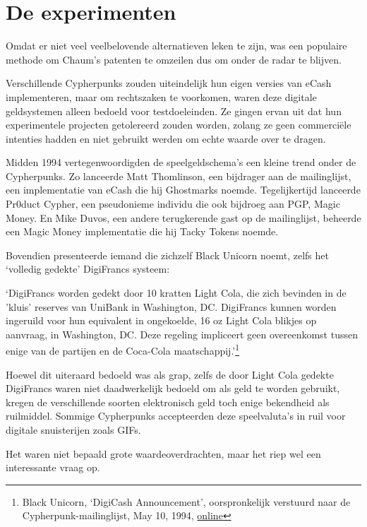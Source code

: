\documentclass[
  a5paper,
  smalldemyvopaper,11pt,twoside,onecolumn,openright,extrafontsizes]{memoir}
\begin{document}
\section{De experimenten}\label{de-experimenten}

Omdat er niet veel veelbelovende alternatieven leken te zijn, was een
populaire methode om Chaum's patenten te omzeilen dus om onder de radar
te blijven.

Verschillende Cypherpunks zouden uiteindelijk hun eigen versies van
eCash implementeren, maar om rechtszaken te voorkomen, waren deze
digitale geldsystemen alleen bedoeld voor testdoeleinden. Ze gingen
ervan uit dat hun experimentele projecten getolereerd zouden worden,
zolang ze geen commerciële intenties hadden en niet gebruikt werden om
echte waarde over te dragen.

Midden 1994 vertegenwoordigden de speelgeldschema's een kleine trend
onder de Cypherpunks. Zo lanceerde Matt Thomlinson, een bijdrager aan de
mailinglijst, een implementatie van eCash die hij Ghostmarks noemde.
Tegelijkertijd lanceerde Pr0duct Cypher, een pseudonieme individu die
ook bijdroeg aan PGP, Magic Money. En Mike Duvos, een andere
terugkerende gast op de mailinglijst, beheerde een Magic Money
implementatie die hij Tacky Tokens noemde.

Bovendien presenteerde iemand die zichzelf Black Unicorn noemt, zelfs
het `volledig gedekte' DigiFrancs systeem:

`DigiFrancs worden gedekt door 10 kratten Light Cola, die zich bevinden
in de 'kluis' reserves van UniBank in Washington, DC. DigiFrancs kunnen
worden ingeruild voor hun equivalent in ongekoelde, 16 oz Light Cola
blikjes op aanvraag, in Washington, DC. Deze regeling impliceert geen
overeenkomst tussen enige van de partijen en de Coca-Cola
maatschappij.'\footnote{Black Unicorn, `DigiCash Announcement',
  oorspronkelijk verstuurd naar de Cypherpunk-mailinglijst, May 10,
  1994,
  \href{https://cypherpunks.venona.com/date/1994/05/msg00616.html}{online}}

Hoewel dit uiteraard bedoeld was als grap, zelfs de door Light Cola
gedekte DigiFrancs waren niet daadwerkelijk bedoeld om als geld te
worden gebruikt, kregen de verschillende soorten elektronisch geld toch
enige bekendheid als ruilmiddel. Sommige Cypherpunks accepteerden deze
speelvaluta's in ruil voor digitale snuisterijen zoals GIFs.

Het waren niet bepaald grote waardeoverdrachten, maar het riep wel een
interessante vraag op.
\end{document}
